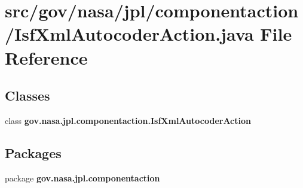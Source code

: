 \section{src/gov/nasa/jpl/componentaction/\+Isf\+Xml\+Autocoder\+Action.java File Reference}
\label{_isf_xml_autocoder_action_8java}
\subsection*{Classes}
\begin{DoxyCompactItemize}
\item 
class {\bf gov.\+nasa.\+jpl.\+componentaction.\+Isf\+Xml\+Autocoder\+Action}
\end{DoxyCompactItemize}
\subsection*{Packages}
\begin{DoxyCompactItemize}
\item 
package {\bf gov.\+nasa.\+jpl.\+componentaction}
\end{DoxyCompactItemize}
